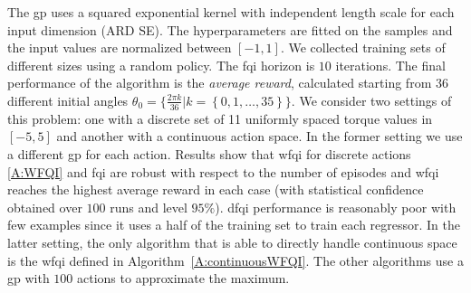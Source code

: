 The \gls{gp} uses a squared exponential kernel with independent length scale for each input dimension (ARD SE). The hyperparameters are fitted on the samples and the input values are normalized between $[-1,1]$.
We collected training sets of different sizes using a random policy.
The \gls{fqi} horizon is $10$ iterations.
The final performance of the algorithm is the \emph{average reward}, calculated starting from $36$ different initial angles $\theta_0 = \lbrace \frac{2\pi k}{36} | k=\left\{0, 1, \ldots, 35\right\}\rbrace$.
We consider two settings of this problem: one with a discrete set of 11 uniformly spaced torque values in $[-5,5]$ and another with a continuous action space.
In the former setting we use a different \gls{gp} for each action.
Results show that \gls{wfqi} for discrete actions \ref{A:WFQI} and \gls{fqi} are robust with respect to the number of episodes and \gls{wfqi} reaches the highest average reward in each case (with statistical confidence obtained over $100$ runs and level $95\%$).
\gls{dfqi} performance is reasonably poor with few examples since it uses a half of the training set to train each regressor.
In the latter setting, the only algorithm that is able to directly handle continuous space is the \gls{wfqi} defined in Algorithm~\ref{A:continuousWFQI}.
The other algorithms use a \gls{gp} with $100$ actions to approximate the maximum.
